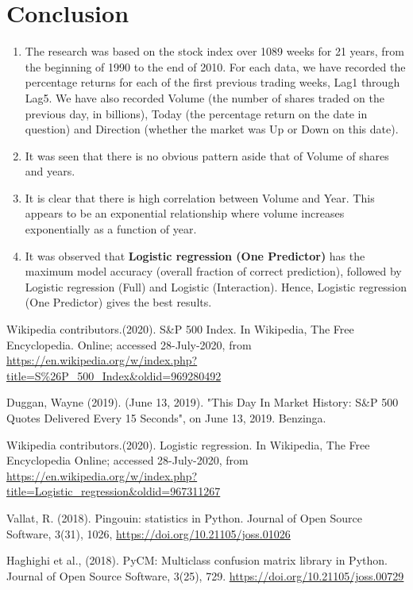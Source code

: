 \documentclass[12pt]{article}
\begin{document}
\section{Conclusion}  \label{Conclusion}
\begin{enumerate}
	\item  The research was based on the stock index over 1089 weeks for 21 years, from the beginning of 1990 to the end of 2010.  For each data,  we have recorded the percentage returns for each of the  first previous trading weeks, Lag1 through Lag5.  We have also recorded Volume (the number of shares traded on the previous day, in billions), Today (the percentage return on the date in question) and Direction (whether the market was Up or Down on this date).
	
	\item It was seen that there is no obvious pattern aside that of Volume of shares and years. 
	
	\item  It is clear that there is high correlation between Volume and Year. This appears to be an exponential relationship where volume increases exponentially as a function of year.
	
	\item It was observed that \textbf{Logistic regression (One Predictor)} has the maximum model accuracy (overall fraction of correct prediction), followed by Logistic regression (Full) and Logistic (Interaction). Hence, Logistic regression (One Predictor) gives the best results.
\end{enumerate}







\begin{thebibliography}{999}

	Wikipedia contributors.(2020). S\&P 500 Index. In Wikipedia, The Free Encyclopedia. Online; accessed 28-July-2020, from {\url{https://en.wikipedia.org/w/index.php?title=S\%26P_500_Index&oldid=969280492}}
	
	Duggan, Wayne (2019). (June 13, 2019). "This Day In Market History: S\&P 500 Quotes Delivered Every 15 Seconds", on June 13, 2019. Benzinga.
	
	Wikipedia contributors.(2020). Logistic regression. In Wikipedia, The Free Encyclopedia Online; accessed 28-July-2020, from  {\url{https://en.wikipedia.org/w/index.php?title=Logistic\_regression\&oldid=967311267}}
	
	Vallat, R. (2018). Pingouin: statistics in Python. Journal of Open Source Software, 3(31), 1026, {\url{https://doi.org/10.21105/joss.01026}}
	
	Haghighi et al., (2018). PyCM: Multiclass confusion matrix library in Python. Journal of Open Source Software, 3(25), 729.
	{\url{https://doi.org/10.21105/joss.00729}}
\end{thebibliography}
\end{document}
